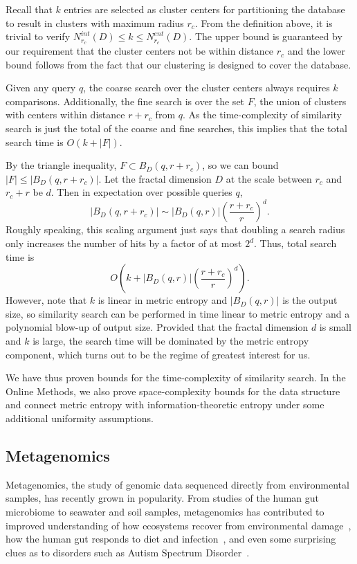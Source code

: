 \documentclass[review,preprint,12pt]{elsarticle}
\theoremstyle{definition}
\theoremstyle{remark}
\numberwithin{equation}{section}
\begin{document}
Recall that $k$ entries are selected as cluster centers for partitioning the database to result in clusters with maximum radius $r_c$.
From the definition above, it is trivial to verify $ N_{r_c}^{int}(D) \le k \le N_{r_c}^{ent} (D)$.
The upper bound is guaranteed by our requirement that the cluster centers not be within distance $r_c$ and the lower bound follows from the fact that our clustering is designed to cover the database.

Given any query $q$, the coarse search over the cluster centers always requires $k$ comparisons.
Additionally, the fine search is over the set $F$, the union of clusters with centers within distance $r+r_c$ from $q$.
As the time-complexity of similarity search is just the total of the coarse and fine searches, this implies that the total search time is $O(k + |F|)$.

By the triangle inequality, $F \subset B_D(q,r+r_c)$,
so we can bound $|F| \le |B_D(q,r+r_c)|$.
Let the fractal dimension $D$ at the scale between $r_c$ and $r_c + r$ be $d$.
Then in expectation over possible queries $q$,
\[
    \left|B_D(q, r+r_c)\right| \sim \left|B_D(q,r)\right|\left(\frac{r+r_c}{r}\right)^d .
\]
Roughly speaking, this scaling argument just says that doubling a search radius only increases the number of hits by a factor of at most $2^d$.
Thus, total search time is 
\[
    O\left(k + \left|B_D(q,r)\right|\left(\frac{r+r_c}{r}\right)^d \right).
\]
However, note that $k$ is linear in metric entropy and $|B_D(q,r)|$ is the output size, so similarity search can be performed in time linear to metric entropy and a polynomial blow-up of output size.
Provided that the fractal dimension $d$ is small and $k$ is large, the search time will be dominated by the metric entropy component, which turns out to be the regime of greatest interest for us.

We have thus proven bounds for the time-complexity of similarity search.
In the Online Methods, we also prove space-complexity bounds for the data structure and connect metric entropy with information-theoretic entropy under some additional uniformity assumptions.

\subsection*{Metagenomics}

Metagenomics, the study of genomic data sequenced directly from environmental
samples, has recently grown in popularity.
From studies of the human gut microbiome to seawater and soil samples,
metagenomics has contributed to improved understanding of how ecosystems recover
from environmental damage~\cite{Tyson:2004}, how the human gut responds to 
diet
and infection~\cite{David:2014}, and even some surprising clues as to disorders 
such as Autism Spectrum Disorder~\cite{MacFabe:2012}.
\end{document}
